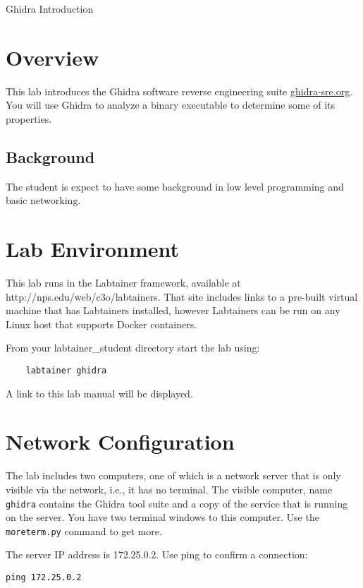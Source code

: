 


\begin{center}
{\LARGE Ghidra Introduction}
\vspace{0.1in}\\
\end{center}


\section{Overview}
This lab introduces the Ghidra software reverse engineering suite \url{ghidra-sre.org}.
You will use Ghidra to analyze a binary executable to determine some of its properties.

\subsection {Background}
The student is expect to have some background in low level programming and basic networking.

\section{Lab Environment}
This lab runs in the Labtainer framework,
available at http://nps.edu/web/c3o/labtainers.
That site includes links to a pre-built virtual machine
that has Labtainers installed, however Labtainers can
be run on any Linux host that supports Docker containers.

From your labtainer_student directory start the lab using:
\begin{verbatim}
    labtainer ghidra
\end{verbatim}
\noindent A link to this lab manual will be displayed.  

\section{Network Configuration}
The lab includes two computers, one of which is a network server that is
only visible via the network, i.e., it has no terminal.  The visible computer,
name {\tt ghidra} contains the Ghidra tool suite and a copy of the service that
is running on the server.  You have two terminal windows to this computer. Use the
{\tt moreterm.py} command to get more.

The server IP address is 172.25.0.2.  Use ping to confirm a connection:
\begin{verbatim}
ping 172.25.0.2
\end{verbatim}


